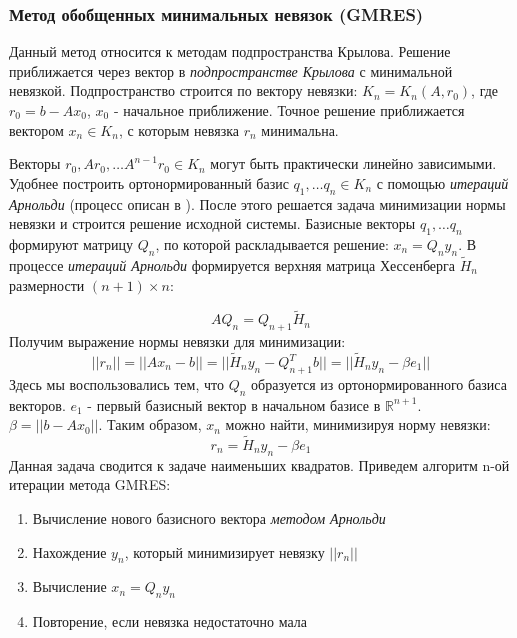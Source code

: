 \subsubsection{Метод обобщенных минимальных невязок (GMRES) \label{methods:gmres}}
Данный метод относится к методам подпространства Крылова.
Решение приближается через вектор в \textit{подпространстве Крылова} с минимальной невязкой. Подпространство строится по вектору невязки: $K_n = K_n(A, r_0)$, где $r_0 = b - Ax_0$, $x_0$ - начальное приближение. Точное решение приближается вектором $x_n \in K_n$, с которым невязка $r_n$ минимальна.
\par
Векторы $r_0, A r_0, \dots A^{n - 1} r_0 \in K_n$  могут быть практически линейно зависимыми. Удобнее построить ортонормированный базис $q_1,\dots q_n \in K_n$  с помощью \textit{итераций Арнольди} (процесс описан в \cite{saad2003iterative}). После этого решается задача минимизации нормы невязки и строится решение исходной системы. Базисные векторы $q_1, \dots q_n$  формируют матрицу $Q_n$, по которой раскладывается решение: $x_n = Q_n y_n$. В процессе \textit{итераций Арнольди} формируется верхняя матрица Хессенберга $\tilde H_n$ размерности $(n + 1) \times n$:

\begin{equation}
A Q_n = Q_{n+1} \tilde H_n
\end{equation}
Получим выражение нормы невязки для минимизации:
\begin{equation}
||r_n|| = ||A x_n - b|| = ||\tilde H_n y_n - Q^T_{n+1} b|| = ||\tilde H_n y_n - \beta e_1||
\end{equation}
Здесь мы воспользовались тем, что $Q_n$ образуется из ортонормированного базиса векторов. $e_1$ - первый базисный вектор в начальном базисе в $\mathbb{R}^{n+1}$. $\beta = ||b - A x_0||$. Таким образом, $x_n$ можно найти, минимизируя норму невязки:
\begin{equation}
r_n = \tilde H_n y_n - \beta e_1
\end{equation}
Данная задача сводится к задаче наименьших квадратов. Приведем алгоритм n-ой итерации метода GMRES:
\begin{enumerate}
\item Вычисление нового базисного вектора \textit{методом Арнольди}
\item Нахождение $y_n$, который минимизирует невязку $||r_n||$
\item Вычисление $x_n = Q_n y_n$
\item Повторение, если невязка недостаточно мала
\end{enumerate}

